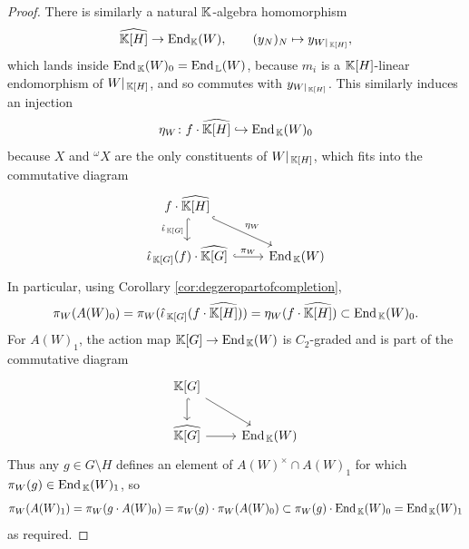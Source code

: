 \begin{proof}
    There is similarly a natural ${\mathbb K}$-algebra homomorphism
\[
 \widehat{{\mathbb K}[H]} \rightarrow \operatorname{End}_{{\mathbb K}}(W), \qquad (y_N)_N \mapsto y_{W|_{\, {\mathbb K}[H]}},
\]
which lands inside $\operatorname{End}_{\, {\mathbb K}}(W)_0 = \operatorname{End}_{\, {\mathbb L}}(W)$, because $m_i$ is a ${\mathbb K}[H]$-linear endomorphism of $W|_{\, {\mathbb K}[H]}$, and so commutes with $y_{W|_{\, {\mathbb K}[H]}}$. This similarly induces an injection
\[
\eta_W \colon f \cdot \widehat{{\mathbb K}[H]} \hookrightarrow \operatorname{End}_{\, {\mathbb K}}(W)_0
\]
because $X$ and ${}^{\omega} X$ are the only constituents of $W|_{\, {\mathbb K}[H]}$, which fits into the commutative diagram
\[\begin{tikzcd}
	{f \cdot\widehat{\bK[H]}} & \\
	{\hat{\iota}_{\bbK[G]}(f) \cdot \widehat{\bK[G]}} & {\End_{\bbK}(W)}
	\arrow["{\hat{\iota}_{\bbK[G]}}"', hook, from=1-1, to=2-1]
	\arrow["{\eta_W}", hook, from=1-1, to=2-2]
	\arrow["{\pi_W}", hook, from=2-1, to=2-2]
\end{tikzcd}\]
In particular, using Corollary \ref{cor:degzeropartofcompletion},
\[
\pi_W(A(W)_0) = \pi_W(\hat{\iota}_{\, {\mathbb K}[G]}(f \cdot\widehat{{\mathbb K}[H]})) = \eta_W(f \cdot\widehat{{\mathbb K}[H]}) \subset \operatorname{End}_{\, {\mathbb K}}(W)_0.
\]
For $A(W)_1$, the action map ${\mathbb K}[G] \rightarrow \operatorname{End}_{\, {\mathbb K}}(W)$ is $C_2$-graded and is part of the commutative diagram
\[\begin{tikzcd}
	{\bK[G]} & \\
	{\widehat{\bK[G]}} & {\End_{\bbK}(W)}
	\arrow[hook, from=1-1, to=2-1]
	\arrow[from=1-1, to=2-2]
	\arrow[from=2-1, to=2-2]
\end{tikzcd}\]
Thus any $g \in G \setminus H$ defines an element of $A(W)^{\times} \cap A(W)_1$ for which $\pi_W(g) \in \operatorname{End}_{\, {\mathbb K}}(W)_1$, so
\[
\pi_W(A(W)_1) = \pi_W(g \cdot A(W)_0) = \pi_W(g) \cdot \pi_W(A(W)_0) \subset \pi_W(g) \cdot \operatorname{End}_{\, {\mathbb K}}(W)_0 = \operatorname{End}_{\, {\mathbb K}}(W)_1
\]
as required.
\end{proof}

